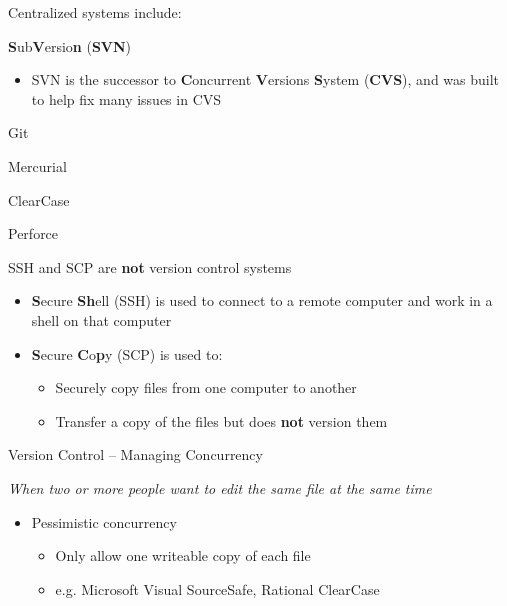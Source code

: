 \begin{itemize}
		\item Centralized systems include:
			\begin{minipage}[h]{\widthof{Mercurial} + 1cm}
				\item Git
				\item Mercurial
			\end{minipage}
			\vspace{\the\itemsep}
			\begin{minipage}[h]{\widthof{ClearCase} + 1cm}
				\item ClearCase
				\item Perforce
			\end{minipage}

		\end{itemize}

		\item SSH and SCP are \textbf{not} version control systems
		\begin{itemize}
			\item \textbf{S}ecure \textbf{Sh}ell (SSH) is used to connect to a remote computer and work in a shell on that computer
			\item \textbf{S}ecure \textbf{C}o\textbf{p}y (SCP) is used to:
			\begin{itemize}
				\item Securely copy files from one computer to another
				\item Transfer a copy of the files but does \textbf{not} version them
			\end{itemize}
		\end{itemize}

		\item Version Control – Managing Concurrency

		\emph{When two or more people want to edit the same file at the same time}
		\begin{itemize}
			\item Pessimistic concurrency
			\begin{itemize}
				\item Only allow one writeable copy of each file
				\item e.g. Microsoft Visual SourceSafe, Rational ClearCase
			\end{itemize}


\end{itemize}
\end{itemize}
